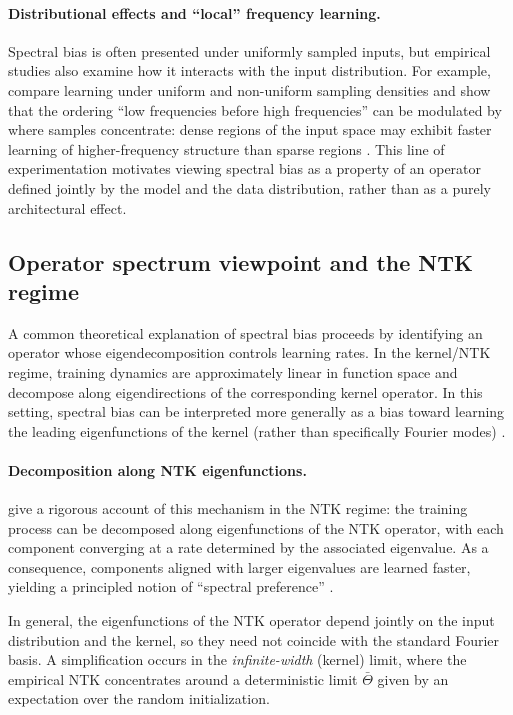 \paragraph{Distributional effects and ``local'' frequency learning.}
Spectral bias is often presented under uniformly sampled inputs, but empirical
studies also examine how it interacts with the input distribution. For example,
\citet{basri2020frequencybiasneuralnetworks} compare learning under uniform and
non-uniform sampling densities and show that the ordering ``low frequencies
before high frequencies'' can be modulated by where samples concentrate: dense
regions of the input space may exhibit faster learning of higher-frequency
structure than sparse regions \citep{basri2020frequencybiasneuralnetworks}.
This line of experimentation motivates viewing spectral bias as a property of an
operator defined jointly by the model and the data distribution, rather than as
a purely architectural effect.

\subsection{Operator spectrum viewpoint and the NTK regime}

A common theoretical explanation of spectral bias proceeds by identifying an
operator whose eigendecomposition controls learning rates. In the kernel/NTK
regime, training dynamics are approximately linear in function space and
decompose along eigendirections of the corresponding kernel operator. In this
setting, spectral bias can be interpreted more generally as a bias toward
learning the leading eigenfunctions of the kernel (rather than specifically
Fourier modes) \citep{bowman2022spectralbiasoutsidetraining}.

\paragraph{Decomposition along NTK eigenfunctions.}
\citet{cao2020understandingspectralbiasdeep} give a rigorous account of this
mechanism in the NTK regime: the training process can be decomposed along
eigenfunctions of the NTK operator, with each component converging at a rate
determined by the associated eigenvalue. As a consequence, components aligned
with larger eigenvalues are learned faster, yielding a principled notion of
``spectral preference'' \citep{cao2020understandingspectralbiasdeep}.

In general, the eigenfunctions of the NTK operator depend jointly on
the input distribution and the kernel, so they need not coincide with the
standard Fourier basis. A simplification occurs in the \emph{infinite-width}
(kernel) limit, where the empirical NTK concentrates around a deterministic
limit $\bar\Theta$ given by an expectation over the random initialization.

